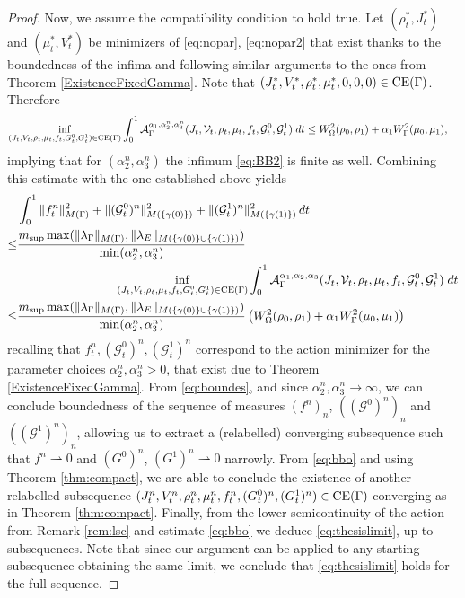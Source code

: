 \documentclass{article}
\def\calA{{\mathcal A}} \def\calB{{\mathcal B}} \def\calC{{\mathcal C}}
\def\calG{{\mathcal G}} \def\calH{{\mathcal H}} \def\calI{{\mathcal I}}
\begin{document}
\begin{proof}
    Now, we assume the compatibility condition to hold true. Let $(\rho^*_t,J^*_t)$ and $(\mu^*_t, V^*_t)$ be minimizers of \eqref{eq:nopar}, \eqref{eq:nopar2} that exist thanks to the boundedness of the infima and following similar arguments to the ones from Theorem \ref{ExistenceFixedGamma}. 
    Note that $(J^*_t, V^*_t, \rho^*_t, \mu^*_t, 0,0,0) \in {\rm CE}(\Gamma)$. Therefore
    \begin{align}\label{eq:bbo}
        \inf_{(J_t, V_t, \rho_t, \mu_t, f_t, G^0_t, G^1_t) \in {\rm CE}(\Gamma)}   \int_{0}^{1} \calA_\Gamma^{\alpha_1, \alpha_2^n, \alpha_3^n}(J_t, \mathcal{V}_t, \rho_t, \mu_t, f_t, \mathcal{G}_t^0, \mathcal{G}_t^1)\; dt &\leq W^2_{\Omega}(\rho_0, \rho_1) + \alpha_1 W^2_\Gamma (\mu_0, \mu_1),
    \end{align}
    implying that for $(\alpha_2^n,\alpha_3^n)$ the infimum \eqref{eq:BB2} is finite as well.
    Combining this estimate with the one established above yields
    \begin{align}
        &\int_0^1 \| f_t^n\|_{M(\Gamma)}^2 + \| (\calG_t^0)^n\|_{M(\{\gamma(0)\})}^2 + \| (\calG_t^1)^n\|_{M(\{\gamma(1)\})}^2 \, dt \nonumber \\
        \leq
        & \frac{m_{\sup} \max(\|\lambda_\Gamma\|_{M(\Gamma)}, \|\lambda_E\|_{M(\{\gamma(0)\} \cup \{\gamma(1)\})})}{\min(\alpha_2^n, \alpha_3^n)} \nonumber \\
        & \qquad \qquad \qquad \qquad \inf_{(J_t, V_t, \rho_t, \mu_t, f_t, G^0_t, G^1_t) \in {\rm CE}(\Gamma)}  \int_{0}^{1} \calA_\Gamma^{\alpha_1, \alpha_2, \alpha_3}(J_t, \mathcal{V}_t, \rho_t, \mu_t, f_t, \mathcal{G}_t^0, \mathcal{G}_t^1)\; dt \label{eq:boundes}\\
        \leq& \frac{m_{\sup} \max(\|\lambda_\Gamma\|_{M(\Gamma)}, \|\lambda_E\|_{M(\{\gamma(0)\} \cup \{\gamma(1)\})})}{\min(\alpha_2^n, \alpha_3^n)} \left( W^2_{\Omega}(\rho_0, \rho_1) + \alpha_1 W^2_\Gamma (\mu_0, \mu_1) \right) \notag
    \end{align}
    recalling that $f_t^{n}, (\calG_t^0)^{n}, (\calG_t^1)^{n}$ correspond to the action minimizer for the parameter choices $\alpha^n_2, \alpha^n_3>0$, that exist due to Theorem \ref{ExistenceFixedGamma}.  
    From \eqref{eq:boundes}, and since $\alpha^n_2,\alpha^n_3 \rightarrow \infty$, we can conclude boundedness of the sequence of measures $(f^n)_n$, $\left((\mathcal{G}^0)^{n}\right)_n$ and $\left((\mathcal{G}^1)^{n}\right)_n$, allowing us to extract a (relabelled) converging subsequence such that $f^{n}\rightharpoonup 0$ and $(G^0)^{n}$, $(G^1)^{n}\rightharpoonup 0$ narrowly. 
    From \eqref{eq:bbo} and using Theorem \ref{thm:compact}, we are able to conclude the existence of another relabelled subsequence $(J_t^n,V_t^n,\rho_t^n,\mu_t^n,f_t^n,(G_t^0)^n,(G_t^1)^n) \in {\rm CE}(\Gamma)$ converging as in Theorem \ref{thm:compact}.  
   Finally, from the lower-semicontinuity of the action from Remark \ref{rem:lsc} and estimate \eqref{eq:bbo} we deduce \eqref{eq:thesislimit}, up to subsequences. Note that since our argument can be applied to any starting subsequence obtaining the same limit, we conclude that \eqref{eq:thesislimit} holds for the full sequence.
\end{proof}
\end{document}
